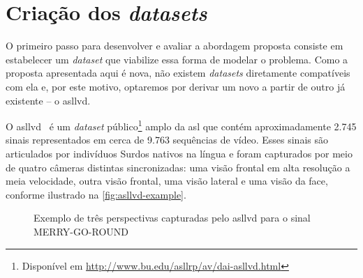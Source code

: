 \section{Criação dos \textit{datasets}}
\label{sec:metodologia-datasets}

O primeiro passo para desenvolver e avaliar a abordagem proposta consiste em estabelecer um \textit{dataset} que viabilize essa forma de modelar o problema. Como a proposta apresentada aqui é nova, não existem \textit{datasets} diretamente compatíveis com ela e, por este motivo, optaremos por derivar um novo a partir de outro já existente -- o \acrfull{asllvd}.

O \acrshort{asllvd}~\cite{athitsos-2008-asllvd,neidle-2012-asllvd} é um \textit{dataset} público\footnote{Disponível em \url{http://www.bu.edu/asllrp/av/dai-asllvd.html}} amplo da \acrshort{asl} que contém aproximadamente 2.745 sinais representados em cerca de 9.763 sequências de vídeo. Esses sinais são articulados por indivíduos Surdos nativos na língua e foram capturados por meio de quatro câmeras distintas sincronizadas: uma visão frontal em alta resolução a meia velocidade, outra visão frontal, uma visão lateral e uma visão da face, conforme ilustrado na \autoref{fig:asllvd-example}.

\begin{figure}[ht!]
    \centering
    \caption{\textmd{Exemplo de três perspectivas capturadas pelo \acrshort{asllvd} para o sinal MERRY-GO-ROUND}}
    \label{fig:asllvd-example}
\end{figure}


